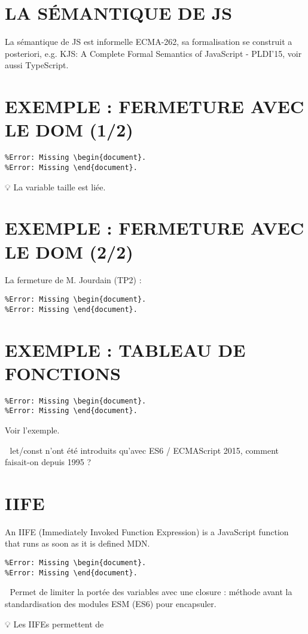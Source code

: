 \documentclass{article}
\begin{document}
\section{LA SÉMANTIQUE DE JS}
La sémantique de JS est informelle ECMA-262, sa formalisation se construit a posteriori, e.g. KJS: A Complete Formal Semantics of JavaScript - PLDI’15, voir aussi TypeScript.

\section{EXEMPLE : FERMETURE AVEC LE DOM (1/2)}
\begin{verbatim}
%Error: Missing \begin{document}.
%Error: Missing \end{document}.
\end{verbatim}

💡 La variable taille est liée.

\section{EXEMPLE : FERMETURE AVEC LE DOM (2/2)}
La fermeture de M. Jourdain (TP2) :
\begin{verbatim}
%Error: Missing \begin{document}.
%Error: Missing \end{document}.
\end{verbatim}

\section{EXEMPLE : TABLEAU DE FONCTIONS}
\begin{verbatim}
%Error: Missing \begin{document}.
%Error: Missing \end{document}.
\end{verbatim}

Voir l’exemple.

🤔 let/const n’ont été introduits qu’avec ES6 / ECMAScript 2015, comment faisait-on depuis 1995 ?

\section{IIFE}
An IIFE (Immediately Invoked Function Expression) is a JavaScript function that runs as soon as it is defined MDN.
\begin{verbatim}
%Error: Missing \begin{document}.
%Error: Missing \end{document}.
\end{verbatim}

📜 Permet de limiter la portée des variables avec une closure : méthode avant la standardisation des modules ESM (ES6) pour encapsuler.

💡 Les IIFEs permettent de
\end{document}

